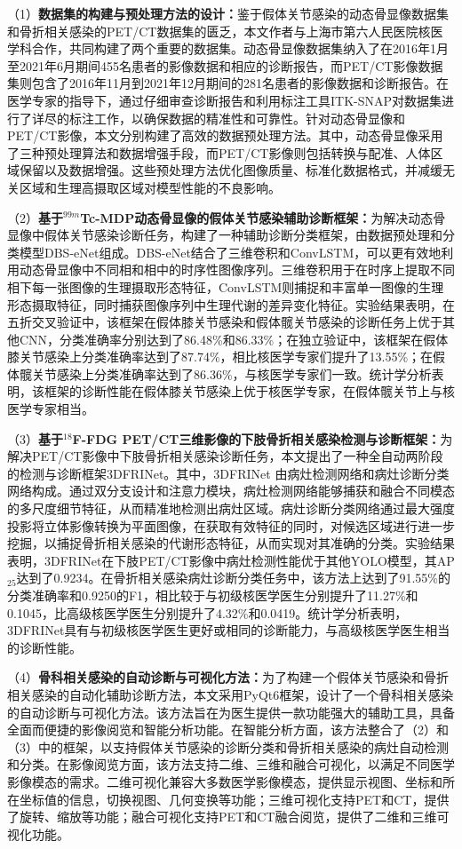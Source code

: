 （1）\textbf{数据集的构建与预处理方法的设计：}鉴于假体关节感染的动态骨显像数据集和骨折相关感染的PET/CT数据集的匮乏，本文作者与上海市第六人民医院核医学科合作，共同构建了两个重要的数据集。动态骨显像数据集纳入了在2016年1月至2021年6月期间455名患者的影像数据和相应的诊断报告，而PET/CT影像数据集则包含了2016年11月到2021年12月期间的281名患者的影像数据和诊断报告。在医学专家的指导下，通过仔细审查诊断报告和利用标注工具ITK-SNAP对数据集进行了详尽的标注工作，以确保数据的精准性和可靠性。针对动态骨显像和PET/CT影像，本文分别构建了高效的数据预处理方法。其中，动态骨显像采用了三种预处理算法和数据增强手段，而PET/CT影像则包括转换与配准、人体区域保留以及数据增强。这些预处理方法优化图像质量、标准化数据格式，并减缓无关区域和生理高摄取区域对模型性能的不良影响。

（2）\textbf{基于\(^{99m}\)Tc-MDP动态骨显像的假体关节感染辅助诊断框架：}为解决动态骨显像中假体关节感染诊断任务，构建了一种辅助诊断分类框架，由数据预处理和分类模型DBS-eNet组成。DBS-eNet结合了三维卷积和ConvLSTM，可以更有效地利用动态骨显像中不同相和相中的时序性图像序列。三维卷积用于在时序上提取不同相下每一张图像的生理摄取形态特征，ConvLSTM则捕捉和丰富单一图像的生理形态摄取特征，同时捕获图像序列中生理代谢的差异变化特征。实验结果表明，在五折交叉验证中，该框架在假体膝关节感染和假体髋关节感染的诊断任务上优于其他CNN，分类准确率分别达到了86.48\%和86.33\%；在独立验证中，该框架在假体膝关节感染上分类准确率达到了87.74\%，相比核医学专家们提升了13.55\%；在假体髋关节感染上分类准确率达到了86.36\%，与核医学专家们一致。统计学分析表明，该框架的诊断性能在假体膝关节感染上优于核医学专家，在假体髋关节上与核医学专家相当。

（3）\textbf{基于\(^{18}\)F-FDG PET/CT三维影像的下肢骨折相关感染检测与诊断框架：}为解决PET/CT影像中下肢骨折相关感染诊断任务，本文提出了一种全自动两阶段的检测与诊断框架3DFRINet。其中，3DFRINet 由病灶检测网络和病灶诊断分类网络构成。通过双分支设计和注意力模块，病灶检测网络能够捕获和融合不同模态的多尺度细节特征，从而精准地检测出病灶区域。病灶诊断分类网络通过最大强度投影将立体影像转换为平面图像，在获取有效特征的同时，对候选区域进行进一步挖掘，以捕捉骨折相关感染的代谢形态特征，从而实现对其准确的分类。实验结果表明，3DFRINet在下肢PET/CT影像中病灶检测性能优于其他YOLO模型，其AP\(_{25}\)达到了0.9234。在骨折相关感染病灶诊断分类任务中，该方法上达到了91.55\%的分类准确率和0.9250的F1，相比较于与初级核医学医生分别提升了11.27\%和0.1045，比高级核医学医生分别提升了4.32\%和0.0419。统计学分析表明，3DFRINet具有与初级核医学医生更好或相同的诊断能力，与高级核医学医生相当的诊断性能。

（4）\textbf{骨科相关感染的自动诊断与可视化方法：}为了构建一个假体关节感染和骨折相关感染的自动化辅助诊断方法，本文采用PyQt6框架，设计了一个骨科相关感染的自动诊断与可视化方法。该方法旨在为医生提供一款功能强大的辅助工具，具备全面而便捷的影像阅览和智能分析功能。在智能分析方面，该方法整合了（2）和（3）中的框架，以支持假体关节感染的诊断分类和骨折相关感染的病灶自动检测和分类。在影像阅览方面，该方法支持二维、三维和融合可视化，以满足不同医学影像模态的需求。二维可视化兼容大多数医学影像模态，提供显示视图、坐标和所在坐标值的信息，切换视图、几何变换等功能；三维可视化支持PET和CT，提供了旋转、缩放等功能；融合可视化支持PET和CT融合阅览，提供了二维和三维可视化功能。

